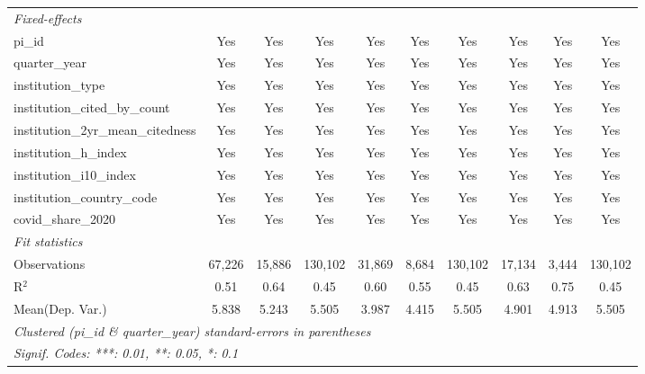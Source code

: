 \begin{tabular}{lccccccccc}
   \midrule
   \emph{Fixed-effects}\\
   pi\_id                                                      & Yes              & Yes             & Yes            & Yes           & Yes           & Yes            & Yes           & Yes           & Yes\\  
   quarter\_year                                               & Yes              & Yes             & Yes            & Yes           & Yes           & Yes            & Yes           & Yes           & Yes\\  
   institution\_type                                           & Yes              & Yes             & Yes            & Yes           & Yes           & Yes            & Yes           & Yes           & Yes\\  
   institution\_cited\_by\_count                               & Yes              & Yes             & Yes            & Yes           & Yes           & Yes            & Yes           & Yes           & Yes\\  
   institution\_2yr\_mean\_citedness                           & Yes              & Yes             & Yes            & Yes           & Yes           & Yes            & Yes           & Yes           & Yes\\  
   institution\_h\_index                                       & Yes              & Yes             & Yes            & Yes           & Yes           & Yes            & Yes           & Yes           & Yes\\  
   institution\_i10\_index                                     & Yes              & Yes             & Yes            & Yes           & Yes           & Yes            & Yes           & Yes           & Yes\\  
   institution\_country\_code                                  & Yes              & Yes             & Yes            & Yes           & Yes           & Yes            & Yes           & Yes           & Yes\\  
   covid\_share\_2020                                          & Yes              & Yes             & Yes            & Yes           & Yes           & Yes            & Yes           & Yes           & Yes\\  
   \midrule
   \emph{Fit statistics}\\
   Observations                                                & 67,226           & 15,886          & 130,102        & 31,869        & 8,684         & 130,102        & 17,134        & 3,444         & 130,102\\  
   R$^2$                                                       & 0.51             & 0.64            & 0.45           & 0.60          & 0.55          & 0.45           & 0.63          & 0.75          & 0.45\\  
Mean(Dep. Var.) & 5.838 & 5.243 & 5.505 & 3.987 & 4.415 & 5.505 & 4.901 & 4.913 & 5.505 \\
   \midrule \midrule
   \multicolumn{10}{l}{\emph{Clustered (pi\_id \& quarter\_year) standard-errors in parentheses}}\\
   \multicolumn{10}{l}{\emph{Signif. Codes: ***: 0.01, **: 0.05, *: 0.1}}\\
\end{tabular}
\par\endgroup

